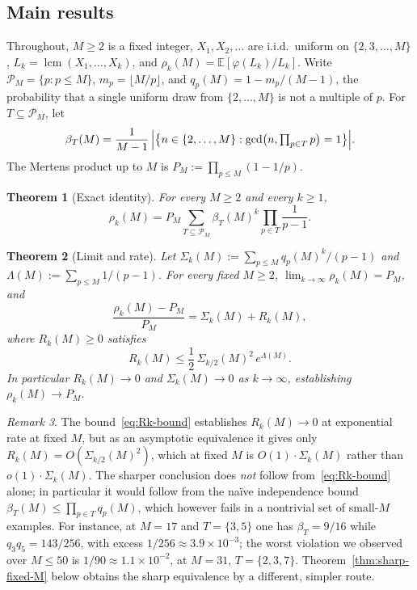 \documentclass[11pt]{article}
\newtheorem{theorem}{Theorem}
\theoremstyle{remark}
\newtheorem{remark}[theorem]{Remark}
\newcommand{\lcm}{\operatorname{lcm}}
\newcommand{\gcdop}{\operatorname{gcd}}
\newcommand{\EE}{\mathbb{E}}
\newcommand{\PM}{\mathcal{P}_M}
\begin{document}
\subsection{Main results}
Throughout, $M \geq 2$ is a fixed integer, $X_1, X_2, \ldots$ are i.i.d.\ uniform on $\{2, 3, \ldots, M\}$, $L_k = \lcm(X_1, \ldots, X_k)$, and $\rho_k(M) = \EE[\varphi(L_k)/L_k]$. Write $\PM = \{p : p \leq M\}$, $m_p = \lfloor M/p \rfloor$, and $q_p(M) = 1 - m_p/(M-1)$, the probability that a single uniform draw from $\{2, \ldots, M\}$ is not a multiple of $p$. For $T \subseteq \PM$, let
\[
\beta_T(M) = \frac{1}{M-1}\,\Bigl|\bigl\{n \in \{2, \ldots, M\} : \gcdop\bigl(n, \textstyle\prod_{p \in T} p\bigr) = 1\bigr\}\Bigr|.
\]
The Mertens product up to $M$ is $P_M := \prod_{p \leq M}(1 - 1/p)$.

\begin{theorem}[Exact identity]\label{thm:identity}
For every $M \geq 2$ and every $k \geq 1$,
\begin{equation}\label{eq:identity}
\rho_k(M) = P_M \sum_{T \subseteq \PM} \beta_T(M)^k \prod_{p \in T} \frac{1}{p-1}.
\end{equation}
\end{theorem}

\begin{theorem}[Limit and rate]\label{thm:limit-rate}
Let $\Sigma_k(M) := \sum_{p \leq M} q_p(M)^k/(p-1)$ and $\Lambda(M) := \sum_{p \leq M} 1/(p-1)$. For every fixed $M \geq 2$, $\lim_{k \to \infty} \rho_k(M) = P_M$, and
\begin{equation}\label{eq:decomp}
\frac{\rho_k(M) - P_M}{P_M} = \Sigma_k(M) + R_k(M),
\end{equation}
where $R_k(M) \geq 0$ satisfies
\begin{equation}\label{eq:Rk-bound}
R_k(M) \leq \frac{1}{2}\,\Sigma_{k/2}(M)^2 \, e^{\Lambda(M)}.
\end{equation}
In particular $R_k(M) \to 0$ and $\Sigma_k(M) \to 0$ as $k \to \infty$, establishing $\rho_k(M) \to P_M$.
\end{theorem}

\begin{remark}\label{rem:sharp-fixed-M}
The bound~\eqref{eq:Rk-bound} establishes $R_k(M) \to 0$ at exponential rate at fixed $M$, but as an asymptotic equivalence it gives only $R_k(M) = O(\Sigma_{k/2}(M)^2)$, which at fixed $M$ is $O(1) \cdot \Sigma_k(M)$ rather than $o(1)\cdot \Sigma_k(M)$. The sharper conclusion does \emph{not} follow from~\eqref{eq:Rk-bound} alone; in particular it would follow from the na\"ive independence bound $\beta_T(M) \leq \prod_{p \in T} q_p(M)$, which however fails in a nontrivial set of small-$M$ examples. For instance, at $M = 17$ and $T = \{3, 5\}$ one has $\beta_T = 9/16$ while $q_3 q_5 = 143/256$, with excess $1/256 \approx 3.9 \times 10^{-3}$; the worst violation we observed over $M \leq 50$ is $1/90 \approx 1.1 \times 10^{-2}$, at $M = 31$, $T = \{2, 3, 7\}$. Theorem~\ref{thm:sharp-fixed-M} below obtains the sharp equivalence by a different, simpler route.
\end{remark}
\end{document}
